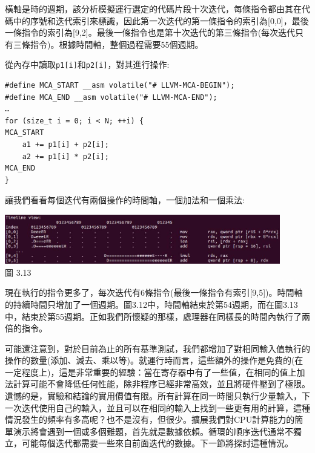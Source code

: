 橫軸是時的週期，該分析模擬運行選定的代碼片段十次迭代，每條指令都由其在代碼中的序號和迭代索引來標識，因此第一次迭代的第一條指令的索引為[0,0]，最後一條指令的索引為[9,2]。最後一條指令也是第十次迭代的第三條指令(每次迭代只有三條指令)。根據時間軸，整個過程需要55個週期。

從內存中讀取\texttt{p1[i]}和\texttt{p2[i]}，對其進行操作:

\begin{lstlisting}[style=styleCXX]
#define MCA_START __asm volatile("# LLVM-MCA-BEGIN");
#define MCA_END __asm volatile("# LLVM-MCA-END");
…
for (size_t i = 0; i < N; ++i) {
MCA_START
	a1 += p1[i] + p2[i];
	a2 += p1[i] * p2[i];
MCA_END
}
\end{lstlisting}

讓我們看看每個迭代有兩個操作的時間軸，一個加法和一個乘法:

\begin{center}
\includegraphics[width=0.9\textwidth]{content/1/chapter3/images/13.jpg}\\
圖 3.13
\end{center}

現在執行的指令更多了，每次迭代有6條指令(最後一條指令有索引[9,5])。時間軸的持續時間只增加了一個週期。圖3.12中，時間軸結束於第54週期，而在圖3.13中，結束於第55週期。正如我們所懷疑的那樣，處理器在同樣長的時間內執行了兩倍的指令。

可能還注意到，對於目前為止的所有基準測試，我們都增加了對相同輸入值執行的操作的數量(添加、減去、乘以等)。就運行時而言，這些額外的操作是免費的(在一定程度上)，這是非常重要的經驗：當在寄存器中有了一些值，在相同的值上加法計算可能不會降低任何性能，除非程序已經非常高效，並且將硬件壓到了極限。遺憾的是，實驗和結論的實用價值有限。所有計算在同一時間只執行少量輸入，下一次迭代使用自己的輸入，並且可以在相同的輸入上找到一些更有用的計算，這種情況發生的頻率有多高呢？也不是沒有，但很少。擴展我們對CPU計算能力的簡單演示將會遇到一個或多個難題，首先就是數據依賴。循環的順序迭代通常不獨立，可能每個迭代都需要一些來自前面迭代的數據。下一節將探討這種情況。

















